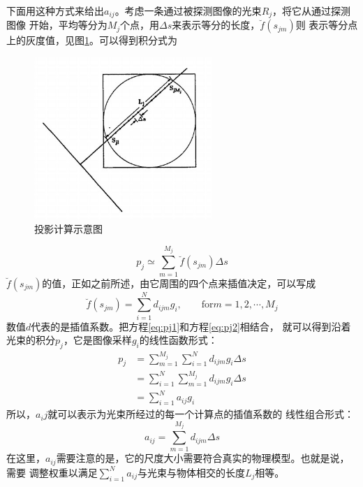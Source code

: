 下面用这种方式来给出$a_{ij}$。考虑一条通过被探测图像的光束$R_j$，将它从通过探测图像
开始，平均等分为$M_j$个点，用$\Delta s$来表示等分的长度，$\breve{f}(s_{jm})$则
表示等分点上的灰度值，见图\ref{fig:sart1}。可以得到积分式为
\begin{figure}[!h]\label{fig:sart1}
\center
\includegraphics[width=0.6\textwidth]{figure/ART/sart1}
\caption{投影计算示意图}
\end{figure}
\begin{equation}\label{eq:pj1}
p_j\simeq\sum^{M_j}_{m=1}\breve{f}(s_{jm})\Delta s
\end{equation}
$\breve{f}(s_{jm})$的值，正如之前所述，由它周围的四个点来插值决定，可以写成
\begin{equation}\label{eq:pj2}
\breve{f}(s_{jm})=\sum^N_{i=1}d_{ijm}g_i,\qquad \text{for}m=1,2,\cdots,M_j
\end{equation}
数值$d$代表的是插值系数。把方程\eqref{eq:pj1}和方程\eqref{eq:pj2}相结合，
就可以得到沿着光束的积分$p_j$，它是图像采样$g_i$的线性函数形式：
\begin{equation}
\begin{split}
p_j&=\sum^{M_j}_{m=1}\sum^N_{i=1}d_{ijm}g_i\Delta s \\
&=\sum^N_{i=1}\sum^{M_j}_{m=1}d_{ijm}g_i\Delta s \\
&=\sum^N_{i=1}a_{ij}g_i
\end{split}
\end{equation}
所以，$a_ij$就可以表示为光束所经过的每一个计算点的插值系数的
线性组合形式：
\begin{equation}\label{eq:computea}
a_{ij}=\sum^{M_j}_{m=1}d_{ijm}\Delta s
\end{equation}
在这里，$a_{ij}$需要注意的是，它的尺度大小需要符合真实的物理模型。也就是说，需要
调整权重以满足$\sum^N_{i=1}a_{ij}$与光束与物体相交的长度$L_j$相等。


